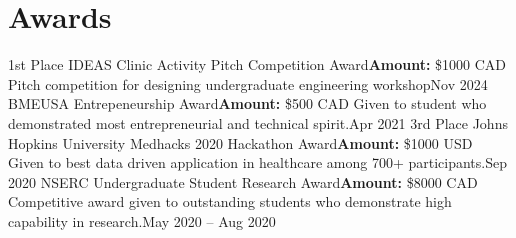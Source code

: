 \section{Awards}
\resumeSubHeadingListStart
  
    \resumeSubheading
      {1st Place IDEAS Clinic Activity Pitch Competition Award}{\textbf{Amount:} \$1000 CAD}
      {Pitch competition for designing undergraduate engineering workshop}{Nov 2024}
    \resumeSubheading
      {BMEUSA Entrepeneurship Award}{\textbf{Amount:} \$500 CAD}
      {Given to student who demonstrated most entrepreneurial and technical spirit.}{Apr 2021}
    \resumeSubheading
      {3rd Place Johns Hopkins University Medhacks 2020 Hackathon Award}{\textbf{Amount:} \$1000 USD}
      {Given to best data driven application in healthcare among 700+ participants.}{Sep 2020}
    \resumeSubheading
      {NSERC Undergraduate Student Research Award}{\textbf{Amount:} \$8000 CAD}
      {Competitive award given to outstanding students who demonstrate high capability in research.}{May 2020 -- Aug 2020}
    
    \resumeSubHeadingListEnd
